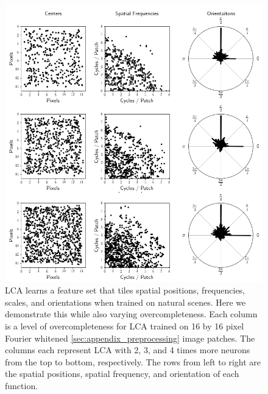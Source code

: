 \begin{figure}\label{fig:ch2_lca_overcompleteness_tiling}
    \centering
    \includegraphics[width=\textwidth]{figures/lca_overcompleteness_location_frequency_centers.png}
    \caption{LCA learns a feature set that tiles spatial positions, frequencies, scales, and orientations when trained on natural scenes. Here we demonstrate this while also varying overcompleteness. Each column is a level of overcompleteness for LCA trained on 16 by 16 pixel Fourier whitened \ref{sec:appendix_preprocessing} image patches. The columns each represent LCA with 2, 3, and 4 times more neurons from the top to bottom, respectively. The rows from left to right are the spatial positions, spatial frequency, and orientation of each function.}
\end{figure}

